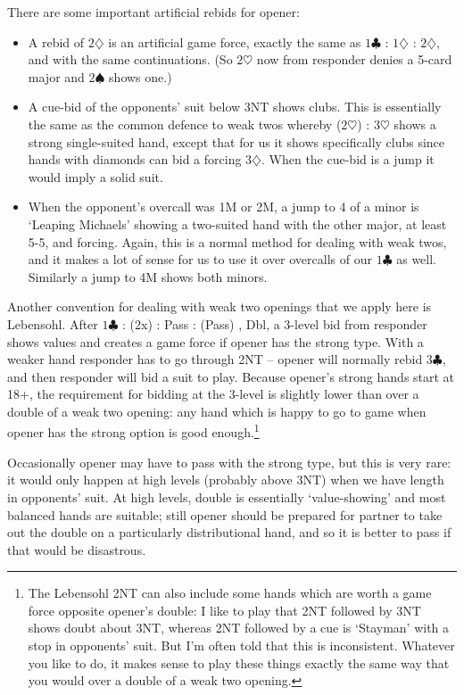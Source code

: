\documentclass{article}
\newcommand{\sz}{\spadesuit}
\newcommand{\hz}{\heartsuit}
\newcommand{\dz}{\diamondsuit}
\newcommand{\cz}{\clubsuit}
\begin{document}
There are some important artificial rebids for opener:

\begin{itemize}
\item A rebid of $2\dz$ is an artificial game force, exactly the same as $1\cz$ : $1\dz$ : $2\dz$, and with the same continuations. (So $2\hz$ now from responder denies a 5-card major and $2\sz$ shows one.) 
\item A cue-bid of the opponents' suit below 3NT shows clubs. This is essentially the same as the common defence to weak twos whereby ($2\hz$) : $3\hz$ shows a strong single-suited hand, except that for us it shows specifically clubs since hands with diamonds can bid a forcing $3\dz$. When the cue-bid is a jump it would imply a solid suit.
\item When the opponent's overcall was 1M or 2M, a jump to 4 of a minor is `Leaping Michaels' showing a two-suited hand with the other major, at least 5-5, and forcing. Again, this is a normal method for dealing with weak twos, and it makes a lot of sense for us to use it over overcalls of our $1\cz$ as well. Similarly a jump to 4M shows both minors.
\end{itemize}

Another convention for dealing with weak two openings that we apply here is Lebensohl. After  $1\cz$ : (2x) : Pass : (Pass) , Dbl, a 3-level bid from responder shows values and creates a game force if opener has the strong type. With a weaker hand responder has to go through 2NT -- opener will normally rebid $3\cz$, and then responder will bid a suit to play. Because opener's strong hands start at 18+, the requirement for bidding at the 3-level is slightly lower than over a double of a weak two opening: any hand which is happy to go to game when opener has the strong option is good enough.\footnote{The Lebensohl 2NT can also include some hands which are worth a game force opposite opener's double: I like to play that 2NT followed by 3NT shows doubt about 3NT, whereas 2NT followed by a cue is `Stayman' with a stop in opponents' suit. But I'm often told that this is inconsistent. Whatever you like to do, it makes sense to play these things exactly the same way that you would over a double of a weak two opening.}

Occasionally opener may have to pass with the strong type, but this is very rare: it would only happen at high levels (probably above 3NT) when we have length in opponents' suit. At high levels, double is essentially `value-showing' and most balanced hands are suitable; still opener should be prepared for partner to take out the double on a particularly distributional hand, and so it is better to pass if that would be disastrous.
\end{document}
